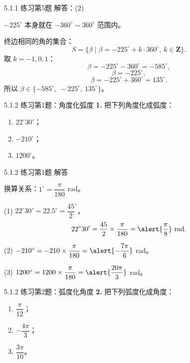 \documentclass[10pt,aspectratio=169,serif]{beamer}
\begin{document}
\begin{frame}[t]{5.1.1 练习第5题 解答：(2)}
\begin{tcolorbox}[colback=orange!10,colframe=orange,title=\textbf{解：(2)}]
$-225^\circ$ 本身就在 $-360^\circ\sim 360^\circ$ 范围内。

终边相同的角的集合：
\[
S = \{\beta \mid \beta = -225^\circ + k\cdot 360^\circ,\ k\in\mathbf{Z}\}.
\]
取 $k=-1,0,1$：
\[
\beta = -225^\circ - 360^\circ = -585^\circ,
\]
\[
\beta = -225^\circ,
\]
\[
\beta = -225^\circ + 360^\circ = 135^\circ.
\]
所以 $\beta\in \{-585^\circ,\ -225^\circ,\ 135^\circ\}$。
\end{tcolorbox}
\end{frame}

\begin{frame}[t]{5.1.2 练习第1题：角度化弧度}
\textbf{1.} 把下列角度化成弧度：
\begin{enumerate}
  \item $22^\circ 30'$；
  \item $-210^\circ$；
  \item $1200^\circ$。
\end{enumerate}
\end{frame}

\begin{frame}[t]{5.1.2 练习第1题 解答}
\begin{tcolorbox}[colback=orange!10,colframe=orange,title=\textbf{解}]
换算关系：$1^\circ = \dfrac{\pi}{180}$ rad。

\vspace{0.3em}
(1) $22^\circ 30' = 22.5^\circ = \dfrac{45}{2}^\circ$，
\[
22^\circ 30' = \frac{45}{2}\times\frac{\pi}{180} = \alert{\frac{\pi}{8}}\ \text{rad}.
\]

(2) $-210^\circ = -210\times\dfrac{\pi}{180} = \alert{-\dfrac{7\pi}{6}}$ rad。

(3) $1200^\circ = 1200\times\dfrac{\pi}{180} = \alert{\dfrac{20\pi}{3}}$ rad。
\end{tcolorbox}
\end{frame}

\begin{frame}[t]{5.1.2 练习第2题：弧度化角度}
\textbf{2.} 把下列弧度化成角度：
\begin{enumerate}
  \item $\dfrac{\pi}{12}$；
  \item $-\dfrac{4\pi}{3}$；
  \item $\dfrac{3\pi}{10}$。
\end{enumerate}
\end{frame}
\end{document}

